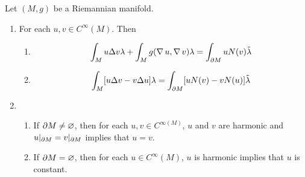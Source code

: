 \documentclass{book}
\begin{document}
\begin{ex}
	Let $(M, g)$ be a Riemannian manifold. 
	\begin{enumerate}
		\item For each $u,v \in C^{\infty}(M)$. Then
		\begin{enumerate}
			\item $$\int_{M} u \Delta v \lambda + \int_M g(\operatorname{\nabla} u, \operatorname{\nabla} v) \lambda = \int_{\partial M} u N(v) \tilde{\lambda}$$ 
			\item $$\int_{M} [u \Delta v - v \Delta u] \lambda = \int_{\partial M} [u N(v) - v N(u)] \tilde{\lambda} $$
		\end{enumerate}
		\item 
		\begin{enumerate}
			\item If $\partial M \neq \varnothing$, then for each $u,v \in C^{\infty(M)}$, $u$ and $v$ are harmonic and $u|_{\partial M} = v|_{\partial M}$ implies that $u = v$. 
			\item If $\partial M = \varnothing$, then for each $u \in C^{\infty}(M)$, $u$ is harmonic implies that  $u$ is constant. 
		\end{enumerate}
	\end{enumerate}
\end{ex}
\end{document}
